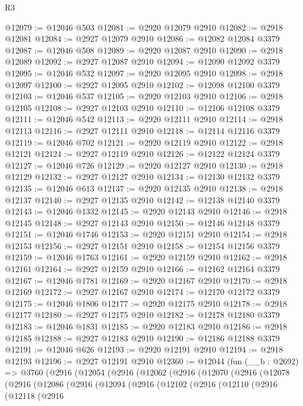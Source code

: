 \begin{lexlean}{R3}
\begin{coremodule}
@12079 := @12046 @503
@12081 := @2920 @12079 @2910
@12082 := @2918 @12081
@12084 := @2927 @12079 @2910
@12086 := @12082 @12084 @3379
@12087 := @12046 @508
@12089 := @2920 @12087 @2910
@12090 := @2918 @12089
@12092 := @2927 @12087 @2910
@12094 := @12090 @12092 @3379
@12095 := @12046 @532
@12097 := @2920 @12095 @2910
@12098 := @2918 @12097
@12100 := @2927 @12095 @2910
@12102 := @12098 @12100 @3379
@12103 := @12046 @537
@12105 := @2920 @12103 @2910
@12106 := @2918 @12105
@12108 := @2927 @12103 @2910
@12110 := @12106 @12108 @3379
@12111 := @12046 @542
@12113 := @2920 @12111 @2910
@12114 := @2918 @12113
@12116 := @2927 @12111 @2910
@12118 := @12114 @12116 @3379
@12119 := @12046 @702
@12121 := @2920 @12119 @2910
@12122 := @2918 @12121
@12124 := @2927 @12119 @2910
@12126 := @12122 @12124 @3379
@12127 := @12046 @726
@12129 := @2920 @12127 @2910
@12130 := @2918 @12129
@12132 := @2927 @12127 @2910
@12134 := @12130 @12132 @3379
@12135 := @12046 @613
@12137 := @2920 @12135 @2910
@12138 := @2918 @12137
@12140 := @2927 @12135 @2910
@12142 := @12138 @12140 @3379
@12143 := @12046 @1332
@12145 := @2920 @12143 @2910
@12146 := @2918 @12145
@12148 := @2927 @12143 @2910
@12150 := @12146 @12148 @3379
@12151 := @12046 @1746
@12153 := @2920 @12151 @2910
@12154 := @2918 @12153
@12156 := @2927 @12151 @2910
@12158 := @12154 @12156 @3379
@12159 := @12046 @1763
@12161 := @2920 @12159 @2910
@12162 := @2918 @12161
@12164 := @2927 @12159 @2910
@12166 := @12162 @12164 @3379
@12167 := @12046 @1781
@12169 := @2920 @12167 @2910
@12170 := @2918 @12169
@12172 := @2927 @12167 @2910
@12174 := @12170 @12172 @3379
@12175 := @12046 @1806
@12177 := @2920 @12175 @2910
@12178 := @2918 @12177
@12180 := @2927 @12175 @2910
@12182 := @12178 @12180 @3379
@12183 := @12046 @1831
@12185 := @2920 @12183 @2910
@12186 := @2918 @12185
@12188 := @2927 @12183 @2910
@12190 := @12186 @12188 @3379
@12191 := @12046 @626
@12193 := @2920 @12191 @2910
@12194 := @2918 @12193
@12196 := @2927 @12191 @2910
@12360 := @12044
    (fun (__b : @2692) =>
    @3760
      (@2916
        (@12054
          (@2916
            (@12062
              (@2916
                (@12070
                  (@2916
                    (@12078
                      (@2916
                        (@12086
                          (@2916
                            (@12094
                              (@2916
                                (@12102
                                  (@2916
                                    (@12110
                                      (@2916
                                        (@12118
                                          (@2916

\end{coremodule}
\end{lexlean}
